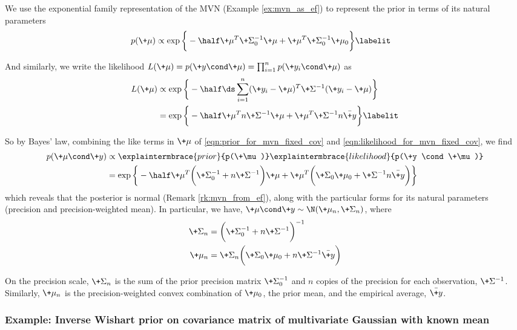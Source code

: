 \documentclass{article} %
\begin{document}
We use the exponential family representation of the MVN (Example \ref{ex:mvn_as_ef}) to represent the prior in terms of its natural parameters
\begin{align*}
	p(\+\mu) &\propto \exp \bigg\{ -\half \+\mu^T \+\Sigma_0^{-1} \+\mu + \+\mu^T \+\Sigma_0^{-1} \+\mu_0 \bigg\} 
\labelit \label{eqn:prior_for_mvn_fixed_cov}
\end{align*}

And similarly, we write the likelihood $	L(\+\mu) = p(\+y \cond \+\mu) = \prod_{i=1}^n p(\+y_i \cond \+\mu)$  as
\begin{align*}
	L(\+\mu) &\propto \exp \bigg\{ -\half \ds\sum_{i=1}^n (\+y_i - \+\mu)^T \+\Sigma^{-1} (\+y_i - \+\mu)\bigg\}  \\
	&= \exp \bigg\{ - \half \+\mu^T n \+\Sigma^{-1} \+\mu + \+\mu^T \+\Sigma^{-1} n \bar{\+y} \bigg\} 
\labelit \label{eqn:likelihood_for_mvn_fixed_cov}
\end{align*}



So by Bayes' law, combining the like terms in $\+\mu$ of \eqref{eqn:prior_for_mvn_fixed_cov} and \eqref{eqn:likelihood_for_mvn_fixed_cov}, we find
\begin{align*}
 p(\+\mu \cond \+y) &\propto \explaintermbrace{prior}{p(\+\mu)}\explaintermbrace{likelihood}{p(\+y \cond \+\mu)} \\
 &= \exp \bigg\{ - \half \+\mu^T \bigg( \+\Sigma_0^{-1} + n  \+\Sigma^{-1}\bigg)  \+\mu + \+\mu^T \bigg( \+\Sigma_0 \+\mu_0 + \+\Sigma^{-1} n \bar{\+y} \bigg) \bigg\} 
\end{align*}
which reveals that the posterior is normal (Remark \ref{rk:mvn_from_ef}), along with the particular forms for its natural parameters (precision and precision-weighted mean).  In particular, we have, $\+\mu \cond \+y \sim \N(\+\mu_n, \+\Sigma_n)$, where
\begin{align*}
	\+\Sigma_n &= \bigg( \+\Sigma_0^{-1} + n \+\Sigma^{-1}\bigg)^{-1} \\
	\+\mu_n &= \+\Sigma_n \bigg(\+\Sigma_0 \+\mu_0 + n \+\Sigma^{-1} \bar{\+y}  \bigg)
\end{align*}

On the precision scale,  $\+\Sigma_n$ is the sum of the prior precision matrix $\+\Sigma_0^{-1}$ and $n$ copies of the precision for each observation,  $\+\Sigma^{-1}$.    Similarly,  $\+\mu_n$ is the precision-weighted convex combination of $\+\mu_0$, the prior mean, and the empirical average, $\bar{\+y}$.

\subsubsection{Example:  Inverse Wishart prior on covariance matrix of multivariate Gaussian with known mean} \label{sec:inverse_wishart_prior_on_mvn_with_known_mean}
 
\end{document}
